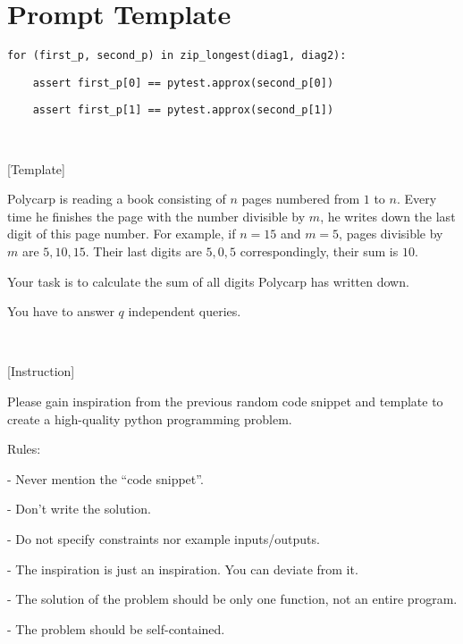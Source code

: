 \section{Prompt Template}
\label{app:prompt-template}
\begin{tcolorbox}

{\tt for (first\_p, second\_p) in zip\_longest(diag1, diag2):}

{\tt\ \ \ \ assert first\_p[0] == pytest.approx(second\_p[0])}

{\tt\ \ \ \ assert first\_p[1] == pytest.approx(second\_p[1])}

\ 

[Template]

Polycarp is reading a book consisting of $n$ pages numbered from $1$ to $n$. Every time he finishes the page with the number divisible by $m$, he writes down the last digit of this page number. For example, if $n=15$ and $m=5$, pages divisible by $m$ are $5, 10, 15$. Their last digits are $5, 0, 5$ correspondingly, their sum is $10$.

Your task is to calculate the sum of all digits Polycarp has written down.

You have to answer $q$ independent queries.

\ 

[Instruction]

Please gain inspiration from the previous random code snippet and template to create a high-quality python programming problem.

Rules:

- Never mention the ``code snippet''.

- Don't write the solution.

- Do not specify constraints nor example inputs/outputs.

- The inspiration is just an inspiration. You can deviate from it.

- The solution of the problem should be only one function, not an entire program.

- The problem should be self-contained.
\end{tcolorbox}

